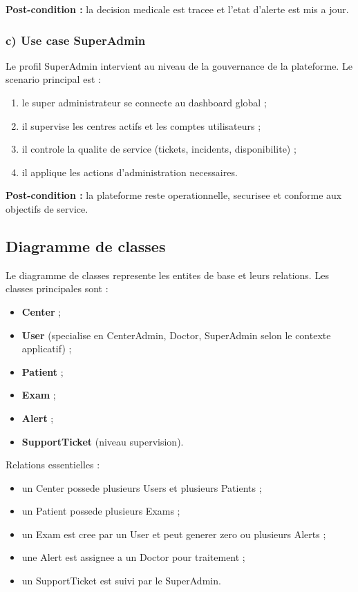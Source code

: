 \textbf{Post-condition :} la decision medicale est tracee et l'etat d'alerte est mis a jour.

\subsubsection*{c) Use case SuperAdmin}
Le profil SuperAdmin intervient au niveau de la gouvernance de la plateforme.
Le scenario principal est :
\begin{enumerate}
    \item le super administrateur se connecte au dashboard global ;
    \item il supervise les centres actifs et les comptes utilisateurs ;
    \item il controle la qualite de service (tickets, incidents, disponibilite) ;
    \item il applique les actions d'administration necessaires.
\end{enumerate}

\textbf{Post-condition :} la plateforme reste operationnelle, securisee et conforme aux objectifs de service.

\subsection{Diagramme de classes}
Le diagramme de classes represente les entites de base et leurs relations.
Les classes principales sont :
\begin{itemize}
    \item \textbf{Center} ;
    \item \textbf{User} (specialise en CenterAdmin, Doctor, SuperAdmin selon le contexte applicatif) ;
    \item \textbf{Patient} ;
    \item \textbf{Exam} ;
    \item \textbf{Alert} ;
    \item \textbf{SupportTicket} (niveau supervision).
\end{itemize}

Relations essentielles :
\begin{itemize}
    \item un Center possede plusieurs Users et plusieurs Patients ;
    \item un Patient possede plusieurs Exams ;
    \item un Exam est cree par un User et peut generer zero ou plusieurs Alerts ;
    \item une Alert est assignee a un Doctor pour traitement ;
    \item un SupportTicket est suivi par le SuperAdmin.
\end{itemize}

